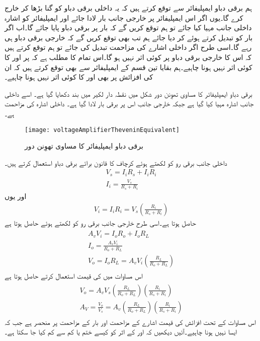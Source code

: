 ہم برقی دباو ایمپلیفائر سے توقع کرتے ہیں کہ یہ داخلی برقی دباو کو  گنا بڑھا کر خارج کرے گا۔یوں اگر اس ایمپلیفائر پر خارجی جانب  بار لادا جائے اور ایمپلیفائر  کو  اشارہ داخلی جانب مہیا کیا جائے تو ہم توقع کریں گے کہ بار پر  برقی دباو پایا جائے گا۔اب اگر بار کو تبدیل کرتے ہوئے  کر دیا جائے ہم تب بھی توقع کریں گے کہ خارجی برقی دباو  ہی رہے گا۔اسی طرح اگر داخلی اشارے کی مزاحمت  تبدیل کی جائے تو ہم توقع کرتے ہیں کہ اس کا خارجی برقی دباو پر کوئی اثر نہیں ہو گا۔اس تمام کا مطلب ہے کہ  پر  اور  کا کوئی اثر نہیں ہونا چاہیے۔ہم بقایا تین قسم کے ایمپلیفائر سے بھی توقع کرتے ہیں کہ ان کی افزائش پر بھی  اور  کا کوئی اثر نہیں ہونا چاہیے۔

 برقی دباو ایمپلیفائر کا مساوی تھوِنن  دور شکل  میں نقطہ دار لکیر میں بند دکھایا گیا ہے۔ اسے داخلی جانب اشارہ  مہیا کیا گیا ہے جبکہ خارجی جانب اس پر برقی بار  لادا گیا ہے۔ داخلی اشارہ کی مزاحمت  ہے۔
\begin{figure}
\centering
\texttt{[image: voltageAmplifierTheveninEquivalent]}
\caption{برقی دباو ایمپلیفائر کا مساوی تھوِنن  دور}
\label{شکل_واپسی_دباو_ایمپلیفائر_تھیونن_مساوی}
\end{figure}
داخلی جانب برقی رو کو   لکھتے ہوئے کرچاف کا قانون برائے برقی دباو استعمال کرتے ہیں۔
\begin{align*}
V_s=I_i R_s+I_i R_i \\
I_i = \frac{V_s}{R_s +R_i}
\end{align*}
اور یوں
\begin{align}
V_i=I_i R_i =V_s \left(\frac{R_i}{R_s+R_i} \right)
\end{align}
حاصل ہوتا ہے۔اسی طرح خارجی جانب برقی رو کو  لکھتے ہوئے حاصل  ہوتا ہے
\begin{gather}
\begin{aligned}\label{مساوات_واپسی_بنیادی_خارجی_حقائق_الف}
A_v V_i = I_o R_o + I_o R_L\\
I_o=\frac{A_v V_i}{R_o + R_L}\\
V_o=I_o R_L = A_v V_i  \left(\frac{R_L}{R_o+R_L}\right)
\end{aligned}
\end{gather}
اس مساوات میں  کی قیمت استعمال کرتے حاصل ہوتا ہے
\begin{gather} \label{مساوات_واپسی_دباو_ایمپلیفائر_کی_افزائش}
\begin{aligned}
V_o=A_v V_s \left (\frac{R_L }{R_o+R_L} \right)  \left (\frac{R_i}{R_s+R_i} \right) \\
A_V=\frac{V_o}{V_s}=A_v \left(\frac{R_L}{R_o+R_L} \right) \left(\frac{R_i}{R_s+R_i} \right )
\end{aligned}
\end{gather}
اس مساوات کے تحت افزائش کی قیمت اشارے کے مزاحمت  اور  بار کے مزاحمت  پر منحصر ہے جب کہ ایسا نہیں ہونا چاہیے۔آئیں دیکھیں کہ  اور   کے اثر کو کیسے ختم یا کم سے کم کیا جا سکتا ہے۔


